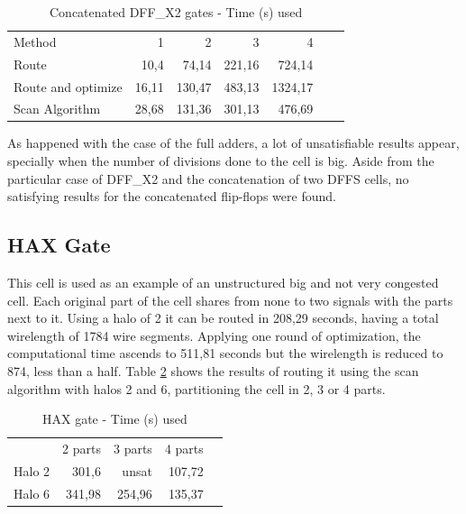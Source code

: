 \begin{table}
\centering
\begin{tabular}{|l|r|r|r|r|r|r|}
\cline{1-5}
Method & 1 & 2 & 3 & 4\\ \cline{1-5}
Route & 10,4 & 74,14 & 221,16 & 724,14\\ \hline
Route and optimize & 16,11 & 130,47 & 483,13 & 1324,17\\ \hline
Scan Algorithm & 28,68 & 131,36 & 301,13 & 476,69\\ \cline{1-5}
\end{tabular}
\caption{Concatenated DFF\_X2 gates - Time (s) used}
\label{tab:scandff}
\end{table}

As happened with the case of the full adders, a lot of unsatisfiable results appear, specially when the number of divisions done to the cell is big. Aside from the particular case of DFF\_X2 and the concatenation of two DFFS cells, no satisfying results for the concatenated flip-flops were found. \\

\subsection{HAX Gate}

This cell is used as an example of an unstructured big and not very congested cell. Each original part of the cell shares from none to two signals with the parts next to it. Using a halo of 2 it can be routed in 208,29 seconds, having a total wirelength of 1784 wire segments. Applying one round of optimization, the computational time ascends to 511,81 seconds but the wirelength is reduced to 874, less than a half. Table \ref{tab:hax_table} shows the results of routing it using the scan algorithm with halos 2 and 6, partitioning the cell in 2, 3 or 4 parts. \\

\begin{table}
\centering
\begin{tabular}{|l|r|r|r|r|}
\cline{1-4}
 & 2 parts & 3 parts & 4 parts \\ \cline{1-4}
Halo 2 & 301,6 & unsat & 107,72 \\ \hline
Halo 6 & 341,98 & 254,96 & 135,37 \\ \cline{1-4}
\end{tabular}
\caption{HAX gate - Time (s) used}
\label{tab:hax_table}
\end{table}


